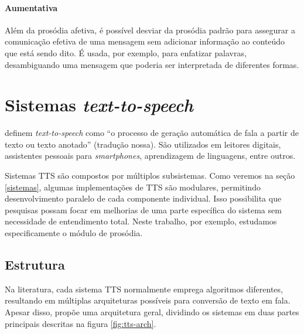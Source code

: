 \paragraph{Aumentativa} Além da prosódia afetiva, é possível desviar da prosódia
padrão para assegurar a comunicação efetiva de uma mensagem sem adicionar
informação ao conteúdo que está sendo dito. É usada, por exemplo, para
enfatizar palavras, desambiguando uma mensagem que poderia ser interpretada de
diferentes formas.

\section{Sistemas \emph{text-to-speech}}
 definem \emph{text-to-speech} como ``o processo de geração
automática de fala a partir de texto ou texto anotado'' (tradução nossa). São
utilizados em leitores digitais, assistentes pessoais para \emph{smartphones},
aprendizagem de linguagens, entre outros.


Sistemas TTS são compostos por múltiplos subsistemas. Como veremos na seção
\ref{sistemas}, algumas implementações de TTS são modulares, permitindo
desenvolvimento paralelo de cada componente individual. Isso possibilita que
pesquisas possam focar em melhorias de uma parte específica do sistema sem
necessidade de entendimento total. Neste trabalho, por exemplo, estudamos
especificamente o módulo de prosódia. %

\subsection{Estrutura}
Na literatura, cada sistema TTS normalmente emprega algoritmos diferentes,
resultando em múltiplas arquiteturas possíveis para conversão de texto em fala.
Apesar disso,  propõe uma arquitetura geral, dividindo os
sistemas em duas partes principais descritas na figura \ref{fig:tts-arch}.

